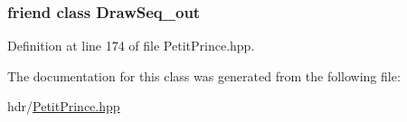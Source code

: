 \subsubsection[{\texorpdfstring{Draw\+Seq\+\_\+out}{DrawSeq_out}}]{\setlength{\rightskip}{0pt plus 5cm}friend class {\bf Draw\+Seq\+\_\+out}\hspace{0.3cm}{\ttfamily [friend]}}\hypertarget{class_draw_seq__var_a6ed6931575fd9d7adbdc41b34a836904}{}\label{class_draw_seq__var_a6ed6931575fd9d7adbdc41b34a836904}


Definition at line 174 of file Petit\+Prince.\+hpp.



The documentation for this class was generated from the following file\+:\begin{DoxyCompactItemize}
\item 
hdr/\hyperlink{_petit_prince_8hpp}{Petit\+Prince.\+hpp}\end{DoxyCompactItemize}

